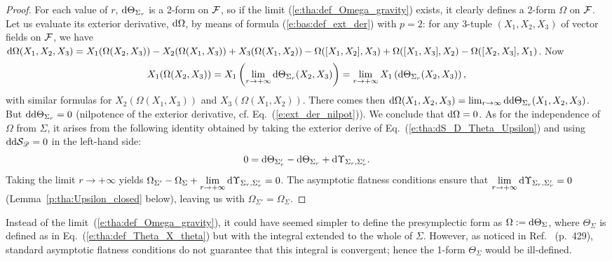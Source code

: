 \begin{proof}
For each value of $r$, $\mathrm{d} \Theta_{\Sigma_r}$ is a 2-form on $\mathcal{F}$, so if the
limit (\ref{e:tha:def_Omega_gravity}) exists, it clearly defines a 2-form
$\Omega$ on $\mathcal{F}$.
Let us evaluate its exterior derivative, $\mathrm{d} \Omega$, by means of formula
(\ref{e:bas:def_ext_der}) with $p=2$: for any 3-tuple $(X_1,X_2,X_3)$ of
vector fields on $\mathcal{F}$, we have
$\mathrm{d}\Omega(X_1,X_2,X_3) = X_1(\Omega(X_2,X_3)) -  X_2(\Omega(X_1,X_3))
+  X_3(\Omega(X_1,X_2)) - \Omega([X_1,X_2], X_3) + \Omega([X_1,X_3], X_2)
- \Omega([X_2,X_3], X_1)$.
Now
\[
X_1(\Omega(X_2,X_3)) = X_1 \left( \lim_{r\to +\infty} \mathrm{d} \Theta_{\Sigma_r}(X_2,X_3) \right)
    = \lim_{r\to +\infty}  X_1 \left( \mathrm{d} \Theta_{\Sigma_r}(X_2,X_3) \right) ,
\]
with similar formulas for $X_2(\Omega(X_1,X_3))$ and $X_3(\Omega(X_1,X_2))$.
There comes then
$\mathrm{d}\Omega(X_1,X_2,X_3) =
    \lim_{r \to \infty} \mathrm{d} \mathrm{d} \Theta_{\Sigma_r}(X_1,X_2,X_3)$.
But $\mathrm{d} \mathrm{d} \Theta_{\Sigma_r} = 0$ (nilpotence of the exterior
derivative, cf. Eq.~(\ref{e:ext_der_nilpot})). We conclude that $\mathrm{d}\Omega = 0$.
As for the independence of $\Omega$ from $\Sigma$, it arises from the following
identity obtained by taking the exterior derive of Eq.~(\ref{e:tha:dS_D_Theta_Upsilon})
and using $\mathrm{d}\mathrm{d} \mathcal{S}_{\mathscr{D}} = 0$
in the left-hand side:
\[
    0 = \mathrm{d} \Theta_{\Sigma'_r} - \mathrm{d} \Theta_{\Sigma_r}
    + \mathrm{d} \Upsilon_{\Sigma_r,\Sigma'_r} .
\]
Taking the limit $r\to +\infty$ yields
$\displaystyle \Omega_{\Sigma'} - \Omega_\Sigma  + \lim_{r\to+\infty} \mathrm{d} \Upsilon_{\Sigma_r,\Sigma'_r} = 0$.
The asymptotic flatness conditions
ensure that $\displaystyle\lim_{r\to+\infty} \mathrm{d} \Upsilon_{\Sigma_r,\Sigma'_r} = 0$ (Lemma~\ref{p:tha:Upsilon_closed} below),
leaving us with $\Omega_{\Sigma'} = \Omega_{\Sigma}$.
\end{proof}

\begin{remark}
Instead of the limit~(\ref{e:tha:def_Omega_gravity}),
it could have seemed simpler to define the presymplectic form
as $\Omega := \mathrm{d}\Theta_{\Sigma}$, where
$\Theta_{\Sigma}$ is defined as in Eq.~(\ref{e:tha:def_Theta_X_theta}) but with the
integral extended to the whole of $\Sigma$. However, as noticed in Ref.~\cite{AshteBR91} (p.~429), standard asymptotic flatness conditions
do not guarantee that this integral is convergent; hence the 1-form $\Theta_{\Sigma}$ would be ill-defined.
\end{remark}


